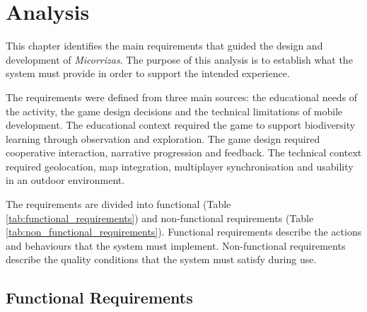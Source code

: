 \chapter{Analysis}
This chapter identifies the main requirements that guided the design and development of \textit{Micorrizas}. The purpose of this analysis is to establish what the system must provide in order to support the intended experience. 

The requirements were defined from three main sources: the educational needs of the activity, the game design decisions and the technical limitations of mobile development. The educational context required the game to support biodiversity learning through observation and exploration. The game design required cooperative interaction, narrative progression and feedback. The technical context required geolocation, map integration, multiplayer synchronisation and usability in an outdoor environment.

The requirements are divided into functional (Table \ref{tab:functional_requirements}) and non-functional requirements (Table \ref{tab:non_functional_requirements}). Functional requirements describe the actions and behaviours that the system must implement. Non-functional requirements describe the quality conditions that the system must satisfy during use.

\section{Functional Requirements}

\renewcommand{\arraystretch}{1}




